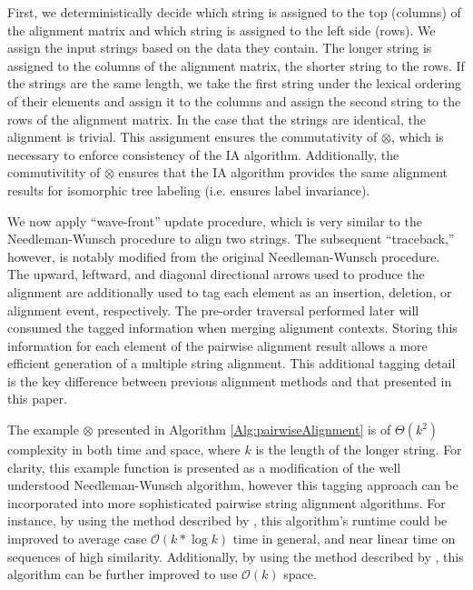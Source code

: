 \documentclass{bmcart}
\begin{document}
First, we deterministically decide which string is assigned to the top (columns) of the alignment matrix and which string is assigned to the left side (rows).
We assign the input strings based on the data they contain.
The longer string is assigned to the columns of the alignment matrix, the shorter string to the rows.
If the strings are the same length, we take the first string under the lexical ordering of their elements and assign it to the columns and assign the second string to the rows of the alignment matrix. 
In the case that the strings are identical, the alignment is trivial.
This assignment ensures the commutativity of $\otimes$, which is necessary to enforce consistency of the IA algorithm.
Additionally, the commutivitity of $\otimes$ ensures that the IA algorithm provides the same alignment results for isomorphic tree labeling (i.e. ensures label invariance).

We now apply ``wave-front'' update procedure, which is very similar to the Needleman-Wunsch procedure to align two strings.
The subsequent ``traceback,'' however, is notably modified from the original Needleman-Wunsch procedure.
The upward, leftward, and diagonal directional arrows used to produce the alignment are additionally used to tag each element as an insertion, deletion, or alignment event, respectively. 
The pre-order traversal performed later will consumed the tagged information when merging alignment contexts.
Storing this information for each element of the pairwise alignment result allows a more efficient generation of a multiple string alignment.
This additional tagging detail is the key difference between previous alignment methods and that presented in this paper.

The example $\otimes$ presented in Algorithm \ref{Alg:pairwiseAlignment}  is of $\Theta\left( k^2 \right)$ complexity in both time and space, where $k$ is the length of the longer string.
For clarity, this example function is presented as a modification of the well understood Needleman-Wunsch algorithm, however this tagging approach can be incorporated into more sophisticated pairwise string alignment algorithms.
For instance, by using the method described by \cite{Ukkonen1985}, this algorithm's runtime could be improved to average case $\mathcal{O}\left( k * \log k \right)$ time in general, and near linear time on sequences of high similarity.
Additionally, by using the method described by \cite{Hirschberg1975}, this algorithm can be further improved to use $\mathcal{O}\left( k \right)$ space.
\end{document}
